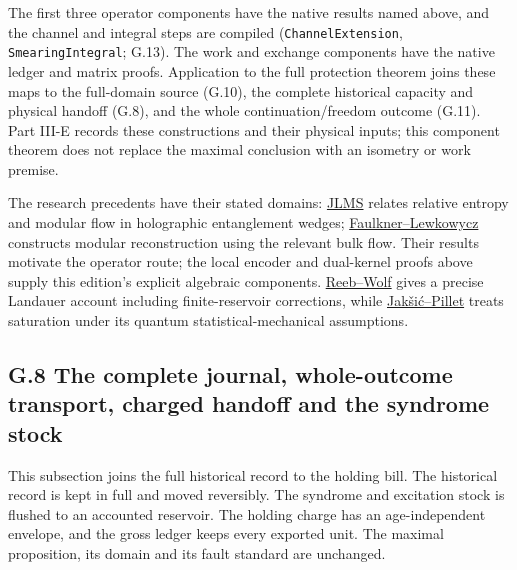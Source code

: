 \documentclass[
]{article}
\begin{document}
The first three operator components have the native results named above,
and the channel and integral steps are compiled
(\texttt{ChannelExtension}, \texttt{SmearingIntegral}; G.13). The work
and exchange components have the native ledger and matrix proofs.
Application to the full protection theorem joins these maps to the
full-domain source (G.10), the complete historical capacity and physical
handoff (G.8), and the whole
c\allowbreak{}o\allowbreak{}n\allowbreak{}t\allowbreak{}i\allowbreak{}n\allowbreak{}u\allowbreak{}a\allowbreak{}t\allowbreak{}i\allowbreak{}o\allowbreak{}n\allowbreak{}/\allowbreak{}f\allowbreak{}r\allowbreak{}e\allowbreak{}e\allowbreak{}d\allowbreak{}o\allowbreak{}m
outcome (G.11). Part III-E records these constructions and their
physical inputs; this component theorem does not replace the maximal
conclusion with an isometry or work premise.

The research precedents have their stated domains:
\href{https://arxiv.org/abs/1512.06431}{JLMS} relates relative entropy
and modular flow in holographic entanglement wedges;
\href{https://arxiv.org/abs/1704.05464}{Faulkner--Lewkowycz} constructs
modular reconstruction using the relevant bulk flow. Their results
motivate the operator route; the local encoder and dual-kernel proofs
above supply this edition's explicit algebraic components.
\href{https://arxiv.org/abs/1306.4352}{Reeb--Wolf} gives a precise
Landauer account including finite-reservoir corrections, while
\href{https://arxiv.org/abs/1406.0034}{Jakšić--Pillet} treats saturation
under its quantum statistical-mechanical assumptions.

\subsection{G.8 The complete journal, whole-outcome transport, charged
handoff and the syndrome
stock}\label{g.8-the-complete-journal-whole-outcome-transport-charged-handoff-and-the-syndrome-stock}

This subsection joins the full historical record to the holding bill.
The historical record is kept in full and moved reversibly. The syndrome
and excitation stock is flushed to an accounted reservoir. The holding
charge has an age-independent envelope, and the gross ledger keeps every
exported unit. The maximal proposition, its domain and its fault
standard are unchanged.
\end{document}
